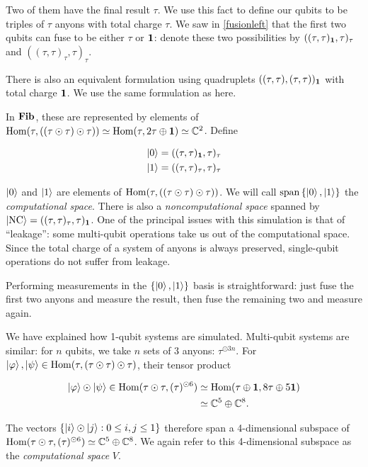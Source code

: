 Two of them have the final result $\tau$. We use this fact to define our qubits
to be triples of $\tau$ anyons with total charge $\tau$. We saw in
\ref{fusionleft} that the first two qubits can fuse to be either $\tau$ or
$\mathbf{1}$: denote these two possibilities by $((\tau,\tau)_{\mathbf{1}},\tau)_\tau$ and
$((\tau,\tau)_\tau,\tau)_\tau$. 

There is also an equivalent formulation using quadruplets
$((\tau,\tau),(\tau,\tau))_{\mathbf{1}}$ with total charge $\mathbf{1}$. We use the same
formulation as \cite{Hormozi2007} here.

In $\mathbf{Fib}$, these are represented by elements of $\operatorname{Hom}(\tau, ((\tau \odot
\tau)\odot \tau)) \simeq \operatorname{Hom}(\tau, 2\tau \oplus \mathbf{1}) \simeq \mathbb{C}^2$. 
Define 

\begin{align}
\left|0\right> = ((\tau,\tau)_{\mathbf{1}} , \tau)_\tau \\
\left|1\right> = ((\tau,\tau)_\tau , \tau)_\tau 
\end{align}

$\left|0\right>$ and $\left|1\right>$ are elements of $\operatorname{Hom}(\tau, ((\tau \odot \tau)\odot
\tau))$. We will call $\operatorname{span}\left\{ \left|0\right>, \left|1\right> \right\}$
the \emph{computational space}. There is also a \emph{noncomputational space}
spanned by $\left|\text{NC}\right> = ((\tau,\tau)_\tau,
\tau)_{\mathbf{1}}$. One of the principal issues with this simulation is that of
``leakage'': some multi-qubit operations take us out of the computational space. 
Since the total charge of a system of anyons is always preserved, single-qubit
operations do not suffer from leakage.

Performing measurements in the $\left\{ \left|0\right>, \left|1\right> \right\}$ basis is
straightforward: just fuse the first two anyons and measure the result, then
fuse the remaining two and measure again.

We have explained how 1-qubit systems are simulated. Multi-qubit systems are
similar: for $n$ qubits, we take $n$ sets of $3$ anyons: $\tau^{\odot 3n}$.
For $\left|\varphi\right>,\left|\psi\right>\in \operatorname{Hom}(\tau,(\tau \odot \tau) \odot \tau)$,
their tensor product 

\begin{align*}
\left|\varphi\right> \odot \left|\psi\right> \in \operatorname{Hom}(\tau \odot \tau, (\tau)^{\odot 6})
    &\simeq \operatorname{Hom}(\tau \oplus \mathbf{1}, 8\tau \oplus 5\mathbf{1}) \\&\simeq \mathbb{C}^5
    \oplus \mathbb{C}^8.
\end{align*}

The vectors $\left\{ \left|i\right>\odot \left|j\right> : 0 \leq i,j\leq 1 \right\}$
therefore span a 4-dimensional subspace of $\operatorname{Hom}(\tau \odot \tau, (\tau)^{\odot
6}) \simeq \mathbb{C}^5 \oplus \mathbb{C}^8$. We again refer to this
4-dimensional subspace as the \emph{computational space} $V$. 

